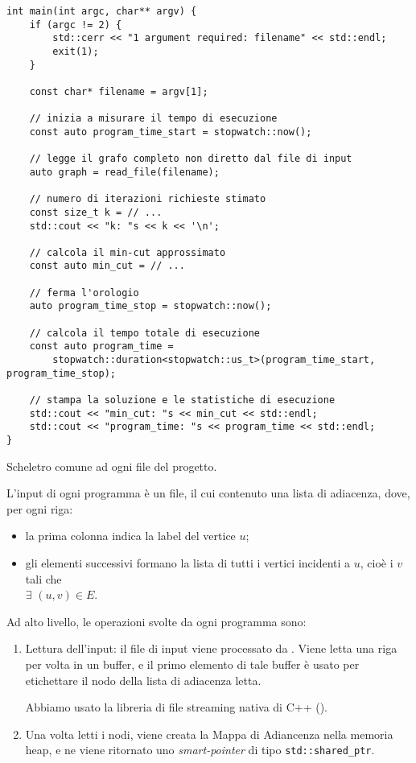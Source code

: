 \begin{listing}[!ht]
\begin{verbatim}
int main(int argc, char** argv) {
    if (argc != 2) {
        std::cerr << "1 argument required: filename" << std::endl;
        exit(1);
    }

    const char* filename = argv[1];

    // inizia a misurare il tempo di esecuzione
    const auto program_time_start = stopwatch::now();

    // legge il grafo completo non diretto dal file di input
    auto graph = read_file(filename);

    // numero di iterazioni richieste stimato
    const size_t k = // ...
    std::cout << "k: "s << k << '\n';

    // calcola il min-cut approssimato
    const auto min_cut = // ...
    
    // ferma l'orologio
    auto program_time_stop = stopwatch::now();

    // calcola il tempo totale di esecuzione
    const auto program_time =
        stopwatch::duration<stopwatch::us_t>(program_time_start, program_time_stop);

    // stampa la soluzione e le statistiche di esecuzione
    std::cout << "min_cut: "s << min_cut << std::endl;
    std::cout << "program_time: "s << program_time << std::endl;
}
\end{verbatim}
\caption{Scheletro comune ad ogni file  del progetto.}
\label{listing:main-cpp}
\end{listing}

L'input di ogni programma è un file, il cui contenuto una lista di
adiacenza, dove, per ogni riga:

\begin{itemize}
    \item la prima colonna indica la label del vertice $u$;
    \item gli elementi successivi formano la lista di tutti i vertici
      incidenti a $u$, cioè i $v$ tali che \\ $\exists$ $(u, v) \in
      E$.
\end{itemize}

\noindent Ad alto livello, le operazioni svolte da ogni programma sono:

\begin{enumerate}
    \item Lettura dell'input: il file di input viene processato
      da . Viene letta una riga per volta in
      un buffer, e il primo elemento di tale buffer è usato per
      etichettare il nodo della lista di adiacenza letta.

    \noindent Abbiamo usato la libreria di file streaming nativa di
    C++ ().

    \item Una volta letti i nodi, viene creata la Mappa di Adiancenza
      nella memoria heap, e ne viene ritornato uno
      \textit{smart-pointer} di tipo
      \texttt{std::shared_ptr}.
\end{enumerate}

